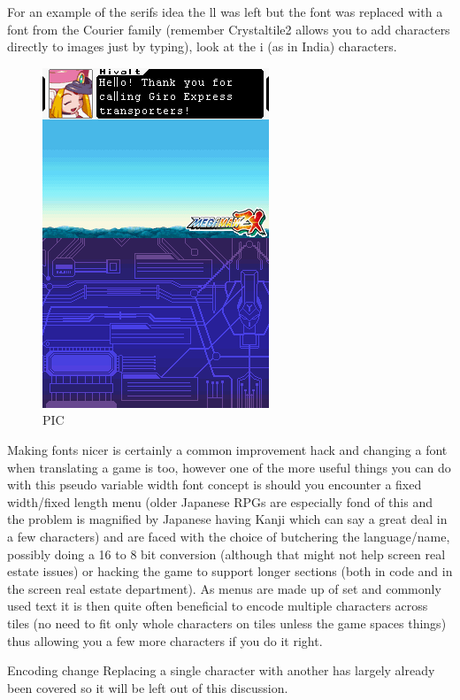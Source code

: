 \documentclass[
]{book}
\begin{document}
For an example of the serifs idea the ll was left but the font was replaced with a font from the Courier family (remember Crystaltile2 allows you to add characters directly to images just by typing), look at the i (as in India) characters.

\begin{figure}
\centering
\includegraphics{images/123_home_fast6191_romhackingguide_unrenamed_fil___inal_borders_romhackingguidefontpseudoedit2.png}
\caption{PIC}
\end{figure}

Making fonts nicer is certainly a common improvement hack and changing a font when translating a game is too, however one of the more useful things you can do with this pseudo variable width font concept is should you encounter a fixed width/fixed length menu (older Japanese RPGs are especially fond of this and the problem is magnified by Japanese having Kanji which can say a great deal in a few characters) and are faced with the choice of butchering the language/name, possibly doing a 16 to 8 bit conversion (although that might not help screen real estate issues) or hacking the game to support longer sections (both in code and in the screen real estate department). As menus are made up of set and commonly used text it is then quite often beneficial to encode multiple characters across tiles (no need to fit only whole characters on tiles unless the game spaces things) thus allowing you a few more characters if you do it right.

Encoding change Replacing a single character with another has largely already been covered so it will be left out of this discussion.
\end{document}
